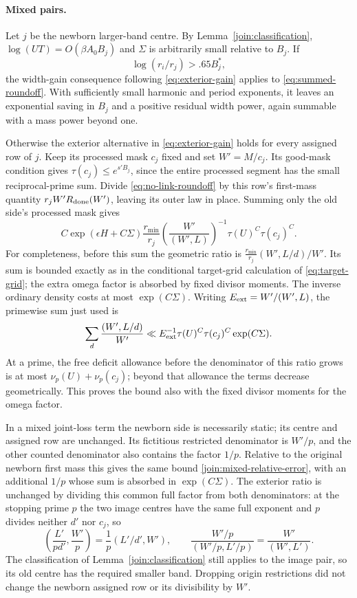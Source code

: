 \paragraph{Mixed pairs.}
Let $j$ be the newborn larger-band centre. By
Lemma~\ref{join:classification}, $\log(UT)=O(\beta A_0B_j)$ and
$\Sigma$ is arbitrarily small relative to $B_j$. If
\[
 \log(r_i/r_j)>.65 B_j^*,
\]
the width-gain consequence following \eqref{eq:exterior-gain} applies
to \eqref{eq:summed-roundoff}. With sufficiently small harmonic and
period exponents, it leaves an exponential saving in $B_j$ and a
positive residual width power, again summable with a mass power
beyond one.

Otherwise the exterior alternative in \eqref{eq:exterior-gain}
holds for every assigned row of $j$. Keep its processed mask $c_j$
fixed and set $W'=M/c_j$. Its good-mask condition gives
$\tau(c_j)\le e^{s'B_j}$, since the entire processed segment has the
small reciprocal-prime sum. Divide \eqref{eq:no-link-roundoff} by
this row's first-mass quantity
$r_jW'R_{\rm done}(W')$, leaving its outer law in place. Summing
only the old side's processed mask gives
\begin{equation}\label{join:mixed-relative-error}
 C\exp(\epsilon H+C\Sigma)\frac{r_{\min}}{r_j}
 \left(\frac{W'}{(W',L)}\right)^{-1}
 \tau(U)^C\tau(c_j)^C.
\end{equation}
For completeness, before this sum the geometric ratio is
$\frac{r_{\min}}{r_j}(W',L/d)/W'$. Its sum is bounded exactly as in
the conditional target-grid calculation of
\eqref{eq:target-grid}; the extra omega factor is absorbed by fixed
divisor moments. The inverse ordinary density costs at most
$\exp(C\Sigma)$.
Writing $E_{\rm ext}=W'/(W',L)$, the primewise sum just used is
\[
 \sum_d\frac{(W',L/d)}{W'}
 \ll E_{\rm ext}^{-1}\tau(U)^C\tau(c_j)^C\exp(C\Sigma).
\]
At a prime, the free deficit allowance before the denominator of
this ratio grows is at most $\nu_p(U)+\nu_p(c_j)$; beyond that
allowance the terms decrease geometrically. This proves the bound
also with the fixed divisor moments for the omega factor.

In a mixed joint-loss term the newborn side is necessarily static;
its centre and assigned row are unchanged. Its
fictitious restricted denominator is $W'/p$, and the other counted
denominator also contains the factor $1/p$. Relative to the original
newborn first mass this gives the same bound
\eqref{join:mixed-relative-error}, with an additional $1/p$ whose
sum is absorbed in $\exp(C\Sigma)$. The exterior ratio is unchanged
by dividing this common full factor from both denominators: at the
stopping prime $p$ the two image centres have the same full exponent
and $p$ divides neither $d'$ nor $c_j$, so
\[
 \left(\frac{L'}{pd'},\frac{W'}p\right)
   =\frac1p(L'/d',W'),\qquad
 \frac{W'/p}{(W'/p,L'/p)}=\frac{W'}{(W',L')}.
\]
The classification of Lemma~\ref{join:classification} still applies
to the image pair, so its old centre has the required smaller band.
Dropping origin restrictions did not change the newborn assigned
row or its divisibility by $W'$.

